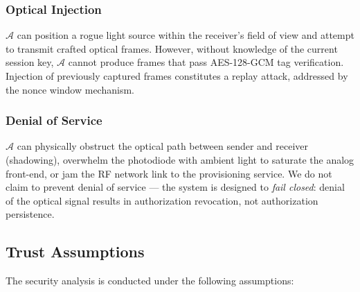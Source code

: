 \documentclass[conference]{IEEEtran}
\begin{document}
\subsubsection{Optical Injection}

$\mathcal{A}$ can position a rogue light source within the receiver's field of view and attempt to transmit crafted optical frames. However, without knowledge of the current session key, $\mathcal{A}$ cannot produce frames that pass AES-128-GCM tag verification. Injection of previously captured frames constitutes a replay attack, addressed by the nonce window mechanism.

\subsubsection{Denial of Service}

$\mathcal{A}$ can physically obstruct the optical path between sender and receiver (shadowing), overwhelm the photodiode with ambient light to saturate the analog front-end, or jam the RF network link to the provisioning service. We do not claim to prevent denial of service — the system is designed to \emph{fail closed}: denial of the optical signal results in authorization revocation, not authorization persistence.

\subsection{Trust Assumptions}

The security analysis is conducted under the following assumptions:
\end{document}
